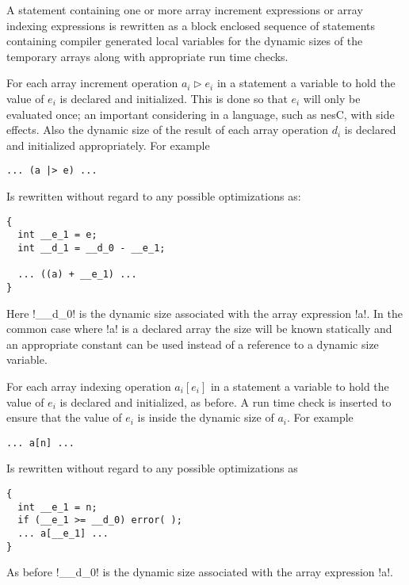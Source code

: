 A statement containing one or more array increment expressions or array indexing expressions is
rewritten as a block enclosed sequence of statements containing compiler generated local
variables for the dynamic sizes of the temporary arrays along with appropriate run time checks.

For each array increment operation $a_i \rhd e_i$ in a statement a variable to hold the value of
$e_i$ is declared and initialized. This is done so that $e_i$ will only be evaluated once; an
important considering in a language, such as nesC, with side effects. Also the dynamic size of
the result of each array operation $d_i$ is declared and initialized appropriately. For example

\singlespace
\begin{lstlisting}[language=nesC]
... (a |> e) ...
\end{lstlisting}
\primaryspacing

Is rewritten without regard to any possible optimizations as:

\singlespace
\begin{lstlisting}[language=nesC]
{
  int __e_1 = e;
  int __d_1 = __d_0 - __e_1;

  ... ((a) + __e_1) ...
}
\end{lstlisting}
\primaryspacing

Here !__d_0! is the dynamic size associated with the array expression !a!. In the common case
where !a! is a declared array the size will be known statically and an appropriate constant can
be used instead of a reference to a dynamic size variable.

For each array indexing operation $a_i[e_i]$ in a statement a variable to hold the value of
$e_i$ is declared and initialized, as before. A run time check is inserted to ensure that
the value of $e_i$ is inside the dynamic size of $a_i$. For example

\singlespace
\begin{lstlisting}[language=nesC]
... a[n] ...
\end{lstlisting}
\primaryspacing

Is rewritten without regard to any possible optimizations as

\singlespace
\begin{lstlisting}[language=nesC]
{
  int __e_1 = n;
  if (__e_1 >= __d_0) error( );
  ... a[__e_1] ...
}
\end{lstlisting}
\primaryspacing

As before !__d_0! is the dynamic size associated with the array expression !a!.


